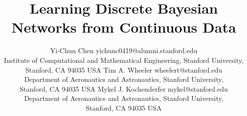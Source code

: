 \documentclass[twoside,11pt]{article}
\begin{document}
\title{Learning Discrete Bayesian Networks from Continuous Data%
}


\author{\name Yi-Chun Chen \email yichunc0419@alumni.stanford.edu \\
	\addr Institute of Computational and Mathematical Engineering, Stanford University,\\
	Stanford, CA  94035 USA
	\AND
	\name Tim A. Wheeler \email wheelert@stanford.edu \\
	\addr Department of Aeronautics and Astronautics, Stanford University,\\
	Stanford, CA  94035 USA
	\AND
	\name Mykel J. Kochenderfer \email mykel@stanford.edu \\
	\addr Department of Aeronautics and Astronautics, Stanford University,\\
	Stanford, CA  94035 USA}

\maketitle
\end{document}
